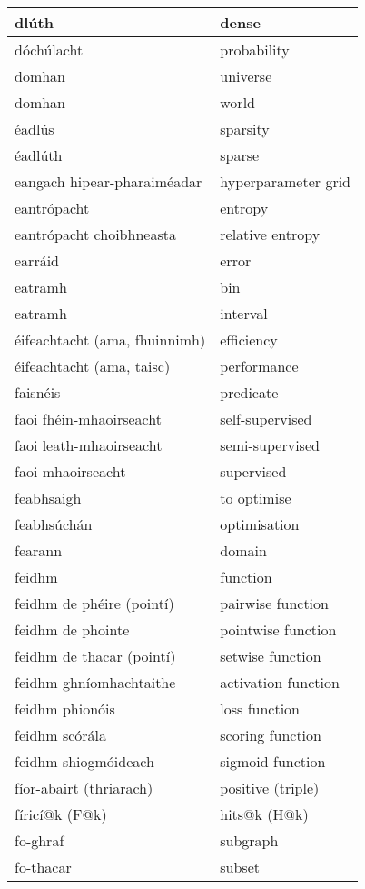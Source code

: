 \documentclass{article}
\begin{document}
\begin{longtable}{|l|l|}
		dlúth&dense\\ \hline 
		dóchúlacht&probability\\ \hline 
		domhan&universe\\ \hline 
		domhan&world\\ \hline 
		éadlús&sparsity\\ \hline 
		éadlúth&sparse\\ \hline 
		eangach hipear-pharaiméadar&hyperparameter grid\\ \hline 
		eantrópacht&entropy\\ \hline 
		eantrópacht choibhneasta&relative entropy\\ \hline 
		earráid&error\\ \hline 
		eatramh&bin\\ \hline 
		eatramh&interval\\ \hline 
		éifeachtacht (ama, fhuinnimh)&efficiency\\ \hline 
		éifeachtacht (ama, taisc)&performance\\ \hline 
		faisnéis&predicate\\ \hline 
		faoi fhéin-mhaoirseacht&self-supervised\\ \hline 
		faoi leath-mhaoirseacht&semi-supervised\\ \hline 
		faoi mhaoirseacht&supervised\\ \hline 
		feabhsaigh&to optimise\\ \hline 
		feabhsúchán&optimisation\\ \hline 
		fearann&domain\\ \hline 
		feidhm&function\\ \hline 
		feidhm de phéire (pointí)&pairwise function\\ \hline 
		feidhm de phointe&pointwise function\\ \hline 
		feidhm de thacar (pointí)&setwise function\\ \hline 
		feidhm ghníomhachtaithe&activation function\\ \hline 
		feidhm phionóis&loss function\\ \hline 
		feidhm scórála&scoring function\\ \hline 
		feidhm shiogmóideach&sigmoid function\\ \hline 
		fíor-abairt (thriarach)&positive (triple)\\ \hline 
		fíricí@k (F@k)&hits@k (H@k)\\ \hline 
		fo-ghraf&subgraph\\ \hline 
		fo-thacar&subset\\ \hline 

\end{longtable}
\end{document}
